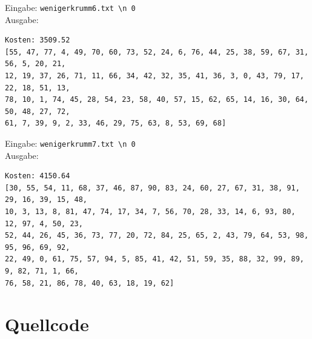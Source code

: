 \documentclass[a4paper,10pt,ngerman]{scrartcl}
\begin{document}
Eingabe: \lstinline|wenigerkrumm6.txt \n 0| \\ Ausgabe:
\begin{lstlisting}
Kosten: 3509.52
[55, 47, 77, 4, 49, 70, 60, 73, 52, 24, 6, 76, 44, 25, 38, 59, 67, 31, 56, 5, 20, 21,
12, 19, 37, 26, 71, 11, 66, 34, 42, 32, 35, 41, 36, 3, 0, 43, 79, 17, 22, 18, 51, 13, 
78, 10, 1, 74, 45, 28, 54, 23, 58, 40, 57, 15, 62, 65, 14, 16, 30, 64, 50, 48, 27, 72, 
61, 7, 39, 9, 2, 33, 46, 29, 75, 63, 8, 53, 69, 68]
\end{lstlisting}
Eingabe: \lstinline|wenigerkrumm7.txt \n 0| \\ Ausgabe:
\begin{lstlisting}
Kosten: 4150.64
[30, 55, 54, 11, 68, 37, 46, 87, 90, 83, 24, 60, 27, 67, 31, 38, 91, 29, 16, 39, 15, 48,
10, 3, 13, 8, 81, 47, 74, 17, 34, 7, 56, 70, 28, 33, 14, 6, 93, 80, 12, 97, 4, 50, 23, 
52, 44, 26, 45, 36, 73, 77, 20, 72, 84, 25, 65, 2, 43, 79, 64, 53, 98, 95, 96, 69, 92, 
22, 49, 0, 61, 75, 57, 94, 5, 85, 41, 42, 51, 59, 35, 88, 32, 99, 89, 9, 82, 71, 1, 66, 
76, 58, 21, 86, 78, 40, 63, 18, 19, 62]
\end{lstlisting}
\section{Quellcode}

\begingroup
\def\chapter*#1{}

\endgroup
\end{document}
